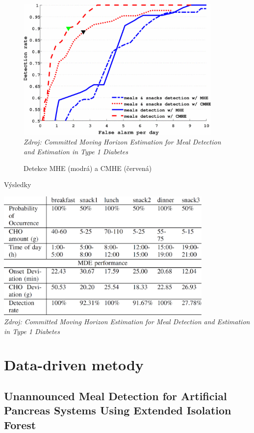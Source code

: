 \begin{figure}[H]
\caption{Detekce MHE (modrá) a CMHE (červená)}
\label{fig:analyza:horizon4}
\centering
\includegraphics[width=0.9\textwidth]{img/analyzaCHO/horizon4.png}\\
\textit{Zdroj: Committed Moving Horizon Estimation for Meal Detection and Estimation in Type 1 Diabetes \citep{analyzaCHO.MovingHorizon}}
\end{figure}

\begin{table}[H]
\caption{Výsledky}
\label{tab:analyza:horizon5}
\centering
\includegraphics[width=0.8\textwidth]{img/analyzaCHO/horizon5.png}\\
\textit{Zdroj: Committed Moving Horizon Estimation for Meal Detection and Estimation in Type 1 Diabetes \citep{analyzaCHO.MovingHorizon}}
\end{table}


\section{Data-driven metody}
\subsection{Unannounced Meal Detection for Artificial Pancreas Systems Using Extended Isolation Forest}
\label{ch:analyzaCHO:forest}

